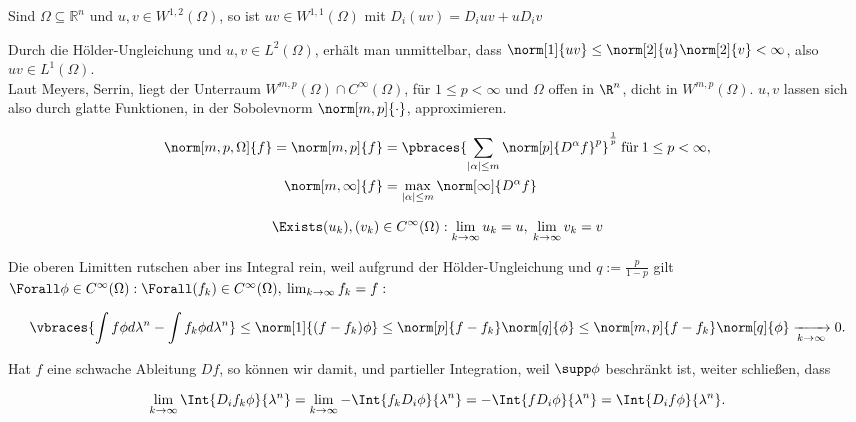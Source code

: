 \begin{exercise}

Sind $\Omega\subseteq\mathbb{R}^n$ und $u,v \in W^{1,2}(\Omega)$, so ist $uv \in W^{1,1}(\Omega)$ mit $D_i(uv) = D_iuv + uD_iv$

\end{exercise}

\begin{solution}
Durch die Hölder-Ungleichung und $u, v \in L^2(\Omega)$, erhält man unmittelbar, dass $\norm[1]{uv} \leq \norm[2]{u} \norm[2]{v} < \infty$, also $uv \in L^1(\Omega)$. \\

Laut Meyers, Serrin, liegt der Unterraum $W^{m, p}(\Omega) \cap C^\infty(\Omega)$, für $1 \leq p < \infty$ und $\Omega$ offen in $\R^n$, dicht in $W^{m, p}(\Omega)$. $u, v$ lassen sich also durch glatte Funktionen, in der Sobolevnorm $\norm[m, p]{\cdot}$, approximieren.

\begin{align*}
  \norm[m, p, \Omega]{f} =
  \norm[m, p]{f} & =
  \pbraces
  {
    \sum_{|\alpha| \leq m}
    \norm[p]{D^\alpha f}^p
  }^\frac{1}{p} \:
  \text{für} \:
  1 \leq p < \infty, \\
  \norm[m, \infty]{f} & =
  \max_{|\alpha| \leq m}
  \norm[\infty]{D^\alpha f}
\end{align*}

\begin{align*}
  \Exists (u_k), (v_k) \in C^\infty(\Omega):
  \lim_{k \to \infty} u_k = u, \:
  \lim_{k \to \infty} v_k = v
\end{align*}

Die oberen Limitten rutschen aber ins Integral rein, weil aufgrund der Hölder-Ungleichung und $q := \frac{p}{1 - p}$ gilt $\Forall \phi \in C^\infty(\Omega): \Forall (f_k) \in C^\infty(\Omega), \: \lim_{k \to \infty} f_k = f:$

\begin{align*}
  \vbraces
  {
    \int f         \phi d \lambda^n -
    \int f_k       \phi d \lambda^n
  } \leq
  \norm[1]{(f - f_k) \phi} \leq
  \norm[p]{f - f_k}
  \norm[q]{\phi} \leq
  \norm[m, p]{f - f_k}
  \norm[q]{\phi}
  \xrightarrow[k \to \infty]{} 0.
\end{align*}

Hat $f$ eine schwache Ableitung $Df$, so können wir damit, und partieller Integration, weil $\supp \phi$ beschränkt ist, weiter schließen, dass

\begin{align*}
  \lim_{k \to \infty}   \Int{D_i f_k \phi}{\lambda^n} =
  \lim_{k \to \infty} - \Int{f_k D_i \phi}{\lambda^n} =
  - \Int{f D_i \phi}{\lambda^n} =
    \Int{D_i f \phi}{\lambda^n}.
\end{align*}


\end{solution}
